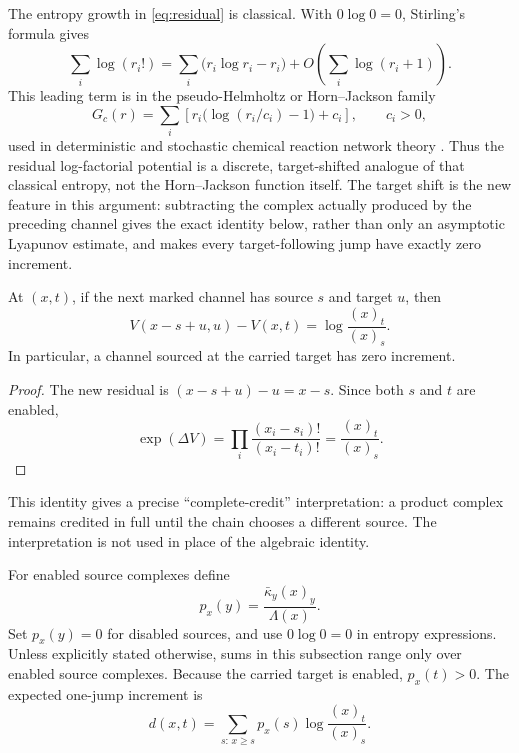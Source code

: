 The entropy growth in \eqref{eq:residual} is classical.  With
\(0\log0=0\), Stirling's formula gives
\begin{equation}\label{eq:stirling-entropy}
 \sum_i\log(r_i!)
 =\sum_i\bigl(r_i\log r_i-r_i\bigr)
  +O\!\left(\sum_i\log(r_i+1)\right).
\end{equation}
This leading term is in the pseudo-Helmholtz or Horn--Jackson family
\[
 G_c(r)=\sum_i\left[r_i\bigl(\log(r_i/c_i)-1\bigr)+c_i\right],
 \qquad c_i>0,
\]
used in deterministic and stochastic chemical reaction network theory
\citep{HornJackson1972,AndersonCraciunGopalkrishnanWiuf2015}.  Thus the residual log-factorial
potential is a discrete, target-shifted analogue of that classical entropy,
not the Horn--Jackson function itself.  The target shift is the new feature in
this argument: subtracting the complex actually produced by the preceding
channel gives the exact identity below, rather than only an asymptotic
Lyapunov estimate, and makes every target-following jump have exactly zero
increment.

\begin{lemma}\label{lem:identity}
At \((x,t)\), if the next marked channel has source \(s\) and target \(u\),
then
\begin{equation}\label{eq:identity}
  V(x-s+u,u)-V(x,t)=\log\frac{(x)_t}{(x)_s}.
\end{equation}
In particular, a channel sourced at the carried target has zero increment.
\end{lemma}

\begin{proof}
The new residual is \((x-s+u)-u=x-s\).  Since both \(s\) and \(t\) are
enabled,
\[
 \exp(\Delta V)
 =\prod_i\frac{(x_i-s_i)!}{(x_i-t_i)!}
 =\frac{(x)_t}{(x)_s}.
\]
\end{proof}

This identity gives a precise ``complete-credit'' interpretation: a product
complex remains credited in full until the chain chooses a different source.
The interpretation is not used in place of the algebraic identity.

For enabled source complexes define
\begin{equation}\label{eq:source-prob}
  p_x(y)=\frac{\bar\kappa_y(x)_y}{\Lambda(x)}.
\end{equation}
Set \(p_x(y)=0\) for disabled sources, and use \(0\log0=0\) in entropy
expressions.  Unless explicitly stated otherwise, sums in this subsection
range only over enabled source complexes.  Because the carried target is
enabled, \(p_x(t)>0\).  The expected one-jump increment is
\begin{equation}\label{eq:d-def}
  d(x,t)=\sum_{s:\,x\ge s}p_x(s)
  \log\frac{(x)_t}{(x)_s}.
\end{equation}

